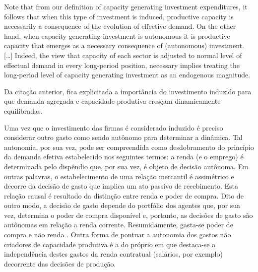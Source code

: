 \begin{citacao}
	Note that from our definition of capacity generating investment expenditures, it follows that when this type of investment is induced, productive capacity is necessarily a consequence of the evolution of effective demand. On the other hand, when capacity generating investment is autonomous it is productive capacity that emerges as a necessary consequence of (autonomous) investment. […] Indeed, the view that capacity of each sector is adjusted to normal level of effectual demand in every long-period position, necessary implies treating the long-period level of capacity generating investment as an endogenous magnitude. \cite[p.~77]{serrano_sraffian_1995}
\end{citacao}
Da citação anterior, fica explicitada a importância do investimento induzido para que demanda agregada e capacidade produtiva cresçam dinamicamente equilibradas.



Uma vez que o investimento das firmas é considerado induzido é preciso considerar outro gasto como sendo autônomo para determinar a dinâmica.
Tal autonomia, por sua vez, pode ser compreendida como desdobramento do princípio da demanda efetiva estabelecido nos seguintes termos: a renda (e o emprego) é determinada pelo dispêndio que, por sua vez, é objeto de decisão autônoma. Em outras palavras, o estabelecimento de uma relação mercantil é assimétrico e decorre da decisão de gasto que implica um ato passivo de recebimento. 
Esta relação causal é resultado da distinção entre renda e poder de compra. Dito de outro modo, a decisão de gasto depende do portfólio dos agentes que, por sua vez, determina o poder de compra disponível e, portanto, as decisões de gasto são autônomas em relação a renda corrente.
Resumidamente, gasta-se poder de compra e não renda  \cites{possas_demanda_1981}[p.~47--72]{possas_dinamica_1987}[p.~1--9]{macedo_e_silva_macroeconomia_1999}.
Outra forma de pontuar a autonomia dos gastos não criadores de capacidade produtiva é a do próprio \textcite{serrano_sraffian_1995} em que destaca-se a independência destes gastos da renda contratual (salários, por exemplo) decorrente das decisões de produção.


